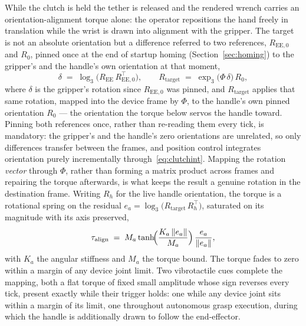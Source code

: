 \documentclass[12pt,a4paper,twoside,openright]{report}
\begin{document}
While the clutch is held the tether is released and the rendered wrench carries an orientation-alignment torque alone: the operator repositions the hand freely in translation while the wrist is drawn into alignment with the gripper. The target is not an absolute orientation but a difference referred to two references, $R_{\text{EE},0}$ and $R_0$, pinned once at the end of startup homing (Section~\ref{sec:homing}) to the gripper's and the handle's own orientation at that moment,
\begin{equation}
\delta \;=\; \log_3\!\bigl(R_{\text{EE}}\,R_{\text{EE},0}^{\top}\bigr),
\qquad
R_{\text{target}} \;=\; \exp_3\!\bigl(\Phi\,\delta\bigr)\, R_0,
\label{eq:clutchalign}
\end{equation}
where $\delta$ is the gripper's rotation since $R_{\text{EE},0}$ was pinned, and $R_{\text{target}}$ applies that same rotation, mapped into the device frame by $\Phi$, to the handle's own pinned orientation $R_0$ --- the orientation the torque below servos the handle toward. Pinning both references once, rather than re-reading them every tick, is mandatory: the gripper's and the handle's zero orientations are unrelated, so only differences transfer between the frames, and position control integrates orientation purely incrementally through~\eqref{eq:clutchint}. Mapping the rotation \emph{vector} through $\Phi$, rather than forming a matrix product across frames and repairing the torque afterwards, is what keeps the result a genuine rotation in the destination frame. Writing $R_h$ for the live handle orientation, the torque is a rotational spring on the residual $e_a = \log_3\!\bigl(R_{\text{target}}\,R_h^{\top}\bigr)$, saturated on its magnitude with its axis preserved,
\begin{equation}
\tau_{\text{align}} \;=\; M_a \tanh\!\Bigl(\frac{K_a\,\| e_a \|}{M_a}\Bigr)\,\frac{e_a}{\| e_a \|},
\label{eq:aligntorque}
\end{equation}
with $K_a$ the angular stiffness and $M_a$ the torque bound. The torque fades to zero within a margin of any device joint limit. Two vibrotactile cues complete the mapping, both a flat torque of fixed small amplitude whose sign reverses every tick, present exactly while their trigger holds: one while any device joint sits within a margin of its limit, one throughout autonomous grasp execution, during which the handle is additionally drawn to follow the end-effector.
\end{document}
